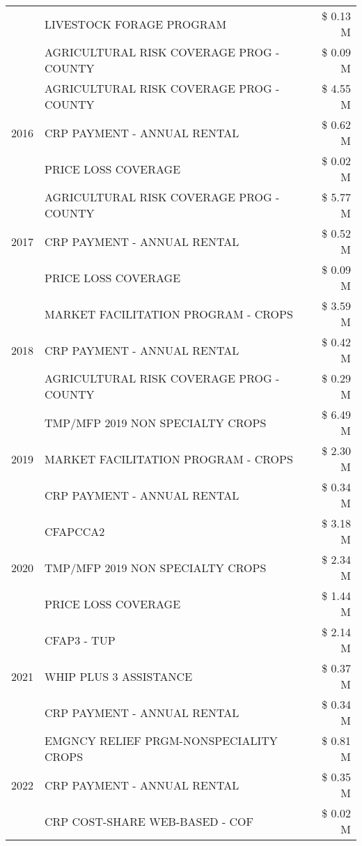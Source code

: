 \begin{tabular}{llr}
 & LIVESTOCK FORAGE PROGRAM & \$ 0.13 M \\
 & AGRICULTURAL RISK COVERAGE PROG - COUNTY & \$ 0.09 M \\
\cline{1-3}
\multirow[t]{3}{*}{2016} & AGRICULTURAL RISK COVERAGE PROG - COUNTY & \$ 4.55 M \\
 & CRP PAYMENT - ANNUAL RENTAL & \$ 0.62 M \\
 & PRICE LOSS COVERAGE & \$ 0.02 M \\
\cline{1-3}
\multirow[t]{3}{*}{2017} & AGRICULTURAL RISK COVERAGE PROG - COUNTY & \$ 5.77 M \\
 & CRP PAYMENT - ANNUAL RENTAL & \$ 0.52 M \\
 & PRICE LOSS COVERAGE & \$ 0.09 M \\
\cline{1-3}
\multirow[t]{3}{*}{2018} & MARKET FACILITATION PROGRAM - CROPS & \$ 3.59 M \\
 & CRP PAYMENT - ANNUAL RENTAL & \$ 0.42 M \\
 & AGRICULTURAL RISK COVERAGE PROG - COUNTY & \$ 0.29 M \\
\cline{1-3}
\multirow[t]{3}{*}{2019} & TMP/MFP 2019 NON SPECIALTY CROPS & \$ 6.49 M \\
 & MARKET FACILITATION PROGRAM - CROPS & \$ 2.30 M \\
 & CRP PAYMENT - ANNUAL RENTAL & \$ 0.34 M \\
\cline{1-3}
\multirow[t]{3}{*}{2020} & CFAPCCA2 & \$ 3.18 M \\
 & TMP/MFP 2019 NON SPECIALTY CROPS & \$ 2.34 M \\
 & PRICE LOSS COVERAGE & \$ 1.44 M \\
\cline{1-3}
\multirow[t]{3}{*}{2021} & CFAP3 - TUP & \$ 2.14 M \\
 & WHIP PLUS 3 ASSISTANCE & \$ 0.37 M \\
 & CRP PAYMENT - ANNUAL RENTAL & \$ 0.34 M \\
\cline{1-3}
\multirow[t]{3}{*}{2022} & EMGNCY RELIEF PRGM-NONSPECIALITY CROPS & \$ 0.81 M \\
 & CRP PAYMENT - ANNUAL RENTAL & \$ 0.35 M \\
 & CRP COST-SHARE WEB-BASED - COF & \$ 0.02 M \\
\cline{1-3}
\bottomrule
\end{tabular}
